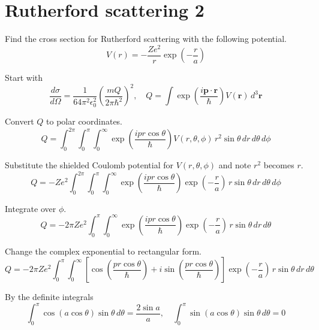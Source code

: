 

\section*{Rutherford scattering 2}

Find the cross section for Rutherford scattering with the following potential.
\begin{equation*}
V(r)=-\frac{Ze^2}{r}\exp\left(-\frac{r}{a}\right)
\end{equation*}

Start with
\begin{equation*}
\frac{d\sigma}{d\Omega}=\frac{1}{64\pi^2\epsilon_0^2}
\left(\frac{mQ}{2\pi\hbar^2}\right)^2,\quad
Q=\int\exp\left(\frac{i\mathbf p\cdot\mathbf r}{\hbar}\right)V(\mathbf r)\,d^3\mathbf r
\end{equation*}

Convert $Q$ to polar coordinates.
\begin{equation*}
Q=\int_0^{2\pi}
\int_0^\pi
\int_0^\infty
\exp\left(\frac{ipr\cos\theta}{\hbar}\right)V(r,\theta,\phi)
\,r^2\sin\theta\,dr\,d\theta\,d\phi
\end{equation*}

Substitute the shielded Coulomb potential for $V(r,\theta,\phi)$ and note $r^2$ becomes $r$.
\begin{equation*}
Q=-Ze^2
\int_0^{2\pi}
\int_0^\pi
\int_0^\infty
\exp\left(\frac{ipr\cos\theta}{\hbar}\right)
\exp\left(-\frac{r}{a}\right)
\,r\sin\theta\,dr\,d\theta\,d\phi
\end{equation*}

Integrate over $\phi$.
\begin{equation*}
Q=-2\pi Ze^2
\int_0^\pi
\int_0^\infty
\exp\left(\frac{ipr\cos\theta}{\hbar}\right)
\exp\left(-\frac{r}{a}\right)
\,r\sin\theta\,dr\,d\theta
\end{equation*}

Change the complex exponential to rectangular form.
\begin{equation*}
Q=-2\pi Ze^2
\int_0^\pi
\int_0^\infty
\left[
\cos\left(\frac{pr\cos\theta}{\hbar}\right)
+i\sin\left(\frac{pr\cos\theta}{\hbar}\right)
\right]
\exp\left(-\frac{r}{a}\right)
\,r\sin\theta\,dr\,d\theta
\end{equation*}

By the definite integrals
\begin{equation*}
\int_0^\pi\cos(a\cos\theta)\sin\theta\,d\theta=\frac{2\sin a}{a},\quad
\int_0^\pi\sin(a\cos\theta)\sin\theta\,d\theta=0
\end{equation*}

